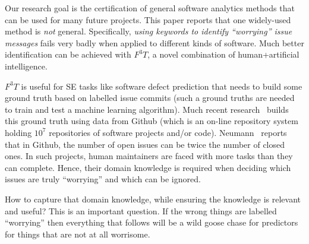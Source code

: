 \documentclass[10pt,conference]{IEEEtran}
\begin{document}



Our research goal is the  certification of general software analytics methods that can be used for many future projects.  
This paper reports that one widely-used method  is {\em not} general.
Specifically, {\em using  keywords to identify  ``worrying'' issue messages}
 fails very badly when applied to different kinds of software. 
 Much better identification can be achieved with    $F^3T$,
 a novel combination of human+artificial intelligence.  
 
   

  $F^3T$ is useful for SE
  tasks like software defect prediction that  needs to build some ground truth based on labelled issue commits
  (such a ground truths are needed to train
 and test a machine
learning algorithm). 
Much recent research~\cite{eirini15promise} builds this ground truth using data from
Github
(which is an on-line repository system holding  $10^7$ repositories of software projects and/or code).
Neumann~\cite{neumann13} reports that in Github,
the number of open issues can be twice the number of closed ones. In such projects, human maintainers are faced with more tasks than they can complete. Hence, their domain knowledge is required when deciding which issues are truly ``worrying''
and which can be ignored. 


How to capture that domain knowledge, while   ensuring
the  knowledge is relevant and useful?  This is an important question.
If the wrong things are labelled ``worrying''  then everything that follows will be a wild goose chase
for  predictors for things that are not  at all  worrisome.
\end{document}
